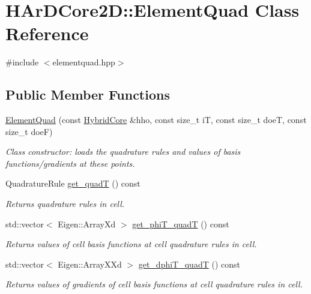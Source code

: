 \hypertarget{classHArDCore2D_1_1ElementQuad}{}\section{H\+Ar\+D\+Core2D\+:\+:Element\+Quad Class Reference}
\label{classHArDCore2D_1_1ElementQuad}


{\ttfamily \#include $<$elementquad.\+hpp$>$}

\subsection*{Public Member Functions}
\begin{DoxyCompactItemize}
\item 
\hyperlink{classHArDCore2D_1_1ElementQuad_a0d27ba99f9f3e6f2a3e5311e6be19eba}{Element\+Quad} (const \hyperlink{classHArDCore2D_1_1HybridCore}{Hybrid\+Core} \&hho, const size\+\_\+t iT, const size\+\_\+t doeT, const size\+\_\+t doeF)
\begin{DoxyCompactList}\small\item\em Class constructor\+: loads the quadrature rules and values of basis functions/gradients at these points. \end{DoxyCompactList}\item 
Quadrature\+Rule \hyperlink{group__HybridCore_ga16951d0e488060237fbb5eee3c5194b2}{get\+\_\+quadT} () const
\begin{DoxyCompactList}\small\item\em Returns quadrature rules in cell. \end{DoxyCompactList}\item 
std\+::vector$<$ Eigen\+::\+Array\+Xd $>$ \hyperlink{group__HybridCore_ga0cde817c1cf12e839c3f195aa02498ba}{get\+\_\+phi\+T\+\_\+quadT} () const
\begin{DoxyCompactList}\small\item\em Returns values of cell basis functions at cell quadrature rules in cell. \end{DoxyCompactList}\item 
std\+::vector$<$ Eigen\+::\+Array\+X\+Xd $>$ \hyperlink{group__HybridCore_gae8e43d7a9a64a009690c4890534e6549}{get\+\_\+dphi\+T\+\_\+quadT} () const
\begin{DoxyCompactList}\small\item\em Returns values of gradients of cell basis functions at cell quadrature rules in cell. \end{DoxyCompactList}\item 

\end{DoxyCompactItemize}
